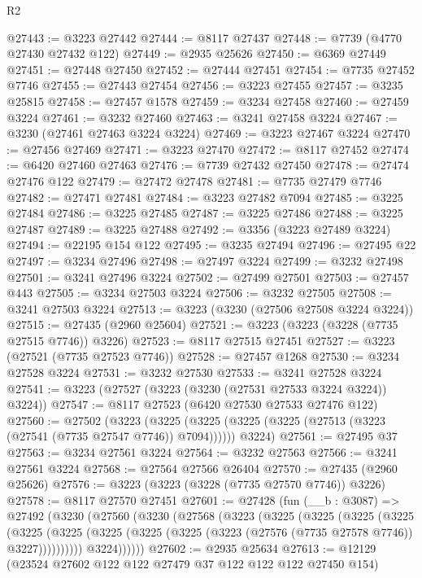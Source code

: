 \begin{lexlean}{R2}
\begin{coremodule}
@27443 := @3223 @27442
@27444 := @8117 @27437
@27448 := @7739 (@4770 @27430 @27432 @122)
@27449 := @2935 @25626
@27450 := @6369 @27449
@27451 := @27448 @27450
@27452 := @27444 @27451
@27454 := @7735 @27452 @7746
@27455 := @27443 @27454
@27456 := @3223 @27455
@27457 := @3235 @25815
@27458 := @27457 @1578
@27459 := @3234 @27458
@27460 := @27459 @3224
@27461 := @3232 @27460
@27463 := @3241 @27458 @3224
@27467 := @3230 (@27461 @27463 @3224 @3224)
@27469 := @3223 @27467 @3224
@27470 := @27456 @27469
@27471 := @3223 @27470
@27472 := @8117 @27452
@27474 := @6420 @27460 @27463
@27476 := @7739 @27432 @27450
@27478 := @27474 @27476 @122
@27479 := @27472 @27478
@27481 := @7735 @27479 @7746
@27482 := @27471 @27481
@27484 := @3223 @27482 @7094
@27485 := @3225 @27484
@27486 := @3225 @27485
@27487 := @3225 @27486
@27488 := @3225 @27487
@27489 := @3225 @27488
@27492 := @3356 (@3223 @27489 @3224)
@27494 := @22195 @154 @122
@27495 := @3235 @27494
@27496 := @27495 @22
@27497 := @3234 @27496
@27498 := @27497 @3224
@27499 := @3232 @27498
@27501 := @3241 @27496 @3224
@27502 := @27499 @27501
@27503 := @27457 @443
@27505 := @3234 @27503 @3224
@27506 := @3232 @27505
@27508 := @3241 @27503 @3224
@27513 := @3223 (@3230 (@27506 @27508 @3224 @3224))
@27515 := @27435 (@2960 @25604)
@27521 := @3223 (@3223 (@3228 (@7735 @27515 @7746)) @3226)
@27523 := @8117 @27515 @27451
@27527 := @3223 (@27521 (@7735 @27523 @7746))
@27528 := @27457 @1268
@27530 := @3234 @27528 @3224
@27531 := @3232 @27530
@27533 := @3241 @27528 @3224
@27541 := @3223 (@27527 (@3223 (@3230 (@27531 @27533 @3224 @3224)) @3224))
@27547 := @8117 @27523 (@6420 @27530 @27533 @27476 @122)
@27560 := @27502
    (@3223
      (@3225 (@3225 (@3225 (@3225 (@27513 (@3223 (@27541 (@7735 @27547 @7746)) @7094))))))
      @3224)
@27561 := @27495 @37
@27563 := @3234 @27561 @3224
@27564 := @3232 @27563
@27566 := @3241 @27561 @3224
@27568 := @27564 @27566 @26404
@27570 := @27435 (@2960 @25626)
@27576 := @3223 (@3223 (@3228 (@7735 @27570 @7746)) @3226)
@27578 := @8117 @27570 @27451
@27601 := @27428
    (fun (__b : @3087) =>
    @27492
      (@3230
        (@27560
          (@3230
            (@27568
              (@3223
                (@3225
                  (@3225
                    (@3225
                      (@3225
                        (@3225
                          (@3225
                            (@3225
                              (@3225 (@3225 (@3223 (@27576 (@7735 @27578 @7746)) @3227))))))))))
                @3224))))))
@27602 := @2935 @25634
@27613 := @12129 (@23524 @27602 @122 @122 @27479 @37 @122 @122 @122 @27450 @154)

\end{coremodule}
\end{lexlean}

